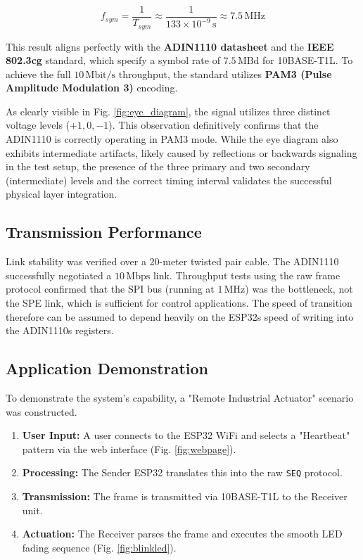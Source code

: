 \documentclass[conference]{IEEEtran}
\begin{document}
	\begin{equation}
		f_{sym} = \frac{1}{T_{sym}} \approx \frac{1}{133 \times 10^{-9}\,\text{s}} \approx 7.5\,\text{MHz}
	\end{equation}
	
	This result aligns perfectly with the \textbf{ADIN1110 datasheet} and the \textbf{IEEE 802.3cg} standard, which specify a symbol rate of $7.5\,\text{MBd}$ for 10BASE-T1L. To achieve the full $10\,\text{Mbit/s}$ throughput, the standard utilizes \textbf{PAM3 (Pulse Amplitude Modulation 3)} encoding.
	
	As clearly visible in Fig. \ref{fig:eye_diagram}, the signal utilizes three distinct voltage levels ($+1, 0, -1$). This observation definitively confirms that the ADIN1110 is correctly operating in PAM3 mode. While the eye diagram also exhibits intermediate artifacts, likely caused by reflections or backwards signaling in the test setup, the presence of the three primary and two secondary (intermediate) levels and the correct timing interval validates the successful physical layer integration.
	
	\subsection{Transmission Performance}
	Link stability was verified over a 20-meter twisted pair cable. The ADIN1110 successfully negotiated a $10\,\text{Mbps}$ link. Throughput tests using the raw frame protocol confirmed that the SPI bus (running at $1\,\text{MHz}$) was the bottleneck, not the SPE link, which is sufficient for control applications.
	The speed of transition therefore can be assumed to depend heavily on the ESP32s speed of writing into the ADIN1110s registers.
	
	\subsection{Application Demonstration}
	To demonstrate the system's capability, a "Remote Industrial Actuator" scenario was constructed. 
	
	\begin{enumerate}
		\item \textbf{User Input:} A user connects to the ESP32 WiFi and selects a "Heartbeat" pattern via the web interface (Fig. \ref{fig:webpage}).
		\item \textbf{Processing:} The Sender ESP32 translates this into the raw \texttt{SEQ} protocol.
		\item \textbf{Transmission:} The frame is transmitted via 10BASE-T1L to the Receiver unit.
		\item \textbf{Actuation:} The Receiver parses the frame and executes the smooth LED fading sequence (Fig. \ref{fig:blinkled}).
	\end{enumerate}
	
\end{document}
